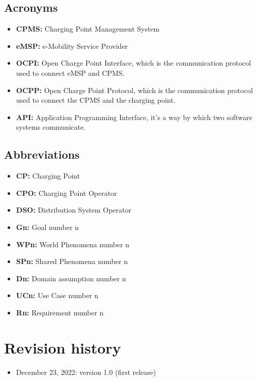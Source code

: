 \documentclass{Configuration_Files/PoliMi3i_thesis}
\begin{document}
\subsection{Acronyms}

\begin{itemize}
    \item \textbf{CPMS:} Charging Point Management System
    \item \textbf{eMSP:} e-Mobility Service Provider
    \item \textbf{OCPI:} Open Charge Point Interface, which is the communication protocol used to connect eMSP and CPMS.
    \item \textbf{OCPP:} Open Charge Point Protocol, which is the communication protocol used to connect the CPMS and the charging point.
    \item \textbf{API:} Application Programming Interface, it's a way by which two software systems communicate.
\end{itemize}

\subsection{Abbreviations}

\begin{itemize}
    \item \textbf{CP:} Charging Point
    \item \textbf{CPO:} Charging Point Operator
    \item \textbf{DSO:} Distribution System Operator
    \item \textbf{Gn:} Goal number n
    \item \textbf{WPn:} World Phenomena number n
    \item \textbf{SPn:} Shared Phenomena number n
    \item \textbf{Dn:} Domain assumption number n
    \item \textbf{UCn:} Use Case number n
    \item \textbf{Rn:} Requirement number n
    
\end{itemize}

\section{Revision history}

\begin{itemize}
    \item December 23, 2022: version 1.0 (first release)
\end{itemize}
\end{document}
